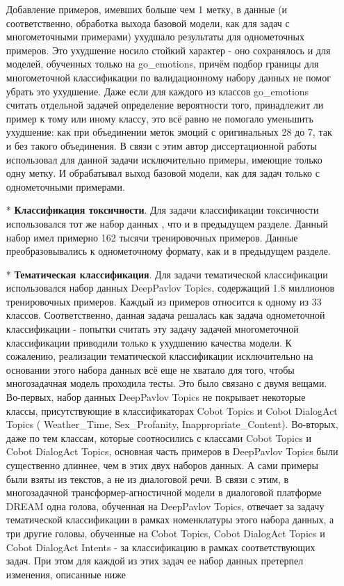 \begin{itemize}
Добавление примеров, имевших больше чем 1 метку, в данные (и соответственно, обработка выхода базовой модели, как для задач с многометочными примерами) ухудшало результаты для однометочных примеров. Это ухудшение носило стойкий характер - оно сохранялось и для моделей, обученных только на go\_emotions, причём подбор границы для многометочной классификации по валидационному набору данных не помог убрать это ухудшение. Даже если для каждого из классов go\_emotions считать отдельной задачей определение вероятности того, принадлежит ли пример к тому или иному классу, это всё равно не помогало уменьшить ухудшение: как при объединении меток эмоций с оригинальных 28 до 7, так и без такого объединения.
В связи с этим автор диссертационной работы использовал для данной задачи исключительно примеры, имеющие только одну метку. И обрабатывал выход базовой модели, как для задач только с однометочными примерами.
 \item[*]\textbf{Классификация токсичности}. Для задачи классификации токсичности использовался тот же набор данных \cite{toxic_kaggle}, что и в предыдущем разделе. Данный набор имел примерно 162 тысячи тренировочных примеров. Данные преобразовывались к однометочному формату, как и в предыдущем разделе.
\item[*]\textbf{Тематическая классификация}. Для задачи тематической классификации использовался набор данных {DeepPavlov Topics}\cite{dp_topics}, содержащий 1.8 миллионов тренировочных примеров. Каждый из примеров относится к одному из 33 классов. Соответственно, данная задача решалась как задача однометочной классификации - попытки считать эту задачу задачей многометочной классификации приводили только к ухудшению качества модели.
К сожалению, реализации тематической классификации исключительно на основании этого набора данных всё еще не хватало для того, чтобы многозадачная модель проходила тесты. Это было связано с двумя вещами. Во-первых, набор данных {DeepPavlov Topics} не покрывает некоторые классы, присутствующие в классификаторах {Cobot Topics} и {Cobot DialogAct Topics} ( Weather\_Time, Sex\_Profanity, Inappropriate\_Content). Во-вторых, даже по тем классам, которые соотносились с классами {Cobot Topics} и {Cobot DialogAct Topics}, основная часть примеров в {DeepPavlov Topics} были существенно длиннее, чем в этих двух наборов данных. А сами примеры были взяты из текстов, а не из диалоговой речи. В связи с этим, в многозадачной трансформер-агностичной модели в диалоговой платформе {DREAM} одна голова, обученная на {DeepPavlov Topics}, отвечает за задачу тематической классификации в рамках номенклатуры этого набора данных, а три другие головы, обученные на {Cobot Topics}, {Cobot DialogAct Topics} и {Cobot DialogAct Intents} - за классификацию в рамках соответствующих задач. При этом для каждой из этих задач ее набор данных претерпел изменения, описанные ниже

\end{itemize}

